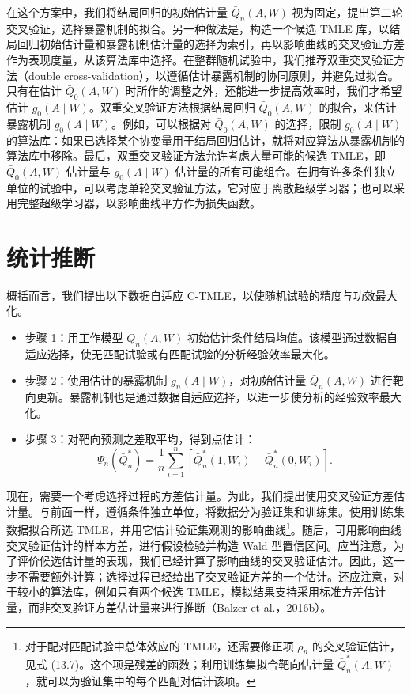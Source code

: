 在这个方案中，我们将结局回归的初始估计量 $\bar Q_n(A,W)$ 视为固定，提出第二轮交叉验证，选择暴露机制的拟合。另一种做法是，构造一个候选 TMLE 库，以结局回归初始估计量和暴露机制估计量的选择为索引，再以影响曲线的交叉验证方差作为表现度量，从该算法库中选择。在整群随机试验中，我们推荐双重交叉验证方法（double cross-validation），以遵循估计暴露机制的协同原则，并避免过拟合。只有在估计 $\bar Q_0(A,W)$ 时所作的调整之外，还能进一步提高效率时，我们才希望估计 $g_0(A\mid W)$。双重交叉验证方法根据结局回归 $\bar Q_0(A,W)$ 的拟合，来估计暴露机制 $g_0(A\mid W)$。例如，可以根据对 $\bar Q_0(A,W)$ 的选择，限制 $g_0(A\mid W)$ 的算法库：如果已选择某个协变量用于结局回归估计，就将对应算法从暴露机制的算法库中移除。最后，双重交叉验证方法允许考虑大量可能的候选 TMLE，即 $\bar Q_0(A,W)$ 估计量与 $g_0(A\mid W)$ 估计量的所有可能组合。在拥有许多条件独立单位的试验中，可以考虑单轮交叉验证方法，它对应于离散超级学习器；也可以采用完整超级学习器，以影响曲线平方作为损失函数。

\section{统计推断}
\label{sec:ch13-inference}

概括而言，我们提出以下数据自适应 C-TMLE，以使随机试验的精度与功效最大化。
\begin{itemize}
 \item 步骤 1：用工作模型 $\bar Q_n(A,W)$ 初始估计条件结局均值。该模型通过数据自适应选择，使无匹配试验或有匹配试验的分析经验效率最大化。
 \item 步骤 2：使用估计的暴露机制 $g_n(A\mid W)$，对初始估计量 $\bar Q_n(A,W)$ 进行靶向更新。暴露机制也是通过数据自适应选择，以进一步使分析的经验效率最大化。
 \item 步骤 3：对靶向预测之差取平均，得到点估计：
 \[
  \Psi_n(\bar Q_n^*)
  =\frac1n\sum_{i=1}^n[\bar Q_n^*(1,W_i)-\bar Q_n^*(0,W_i)].
 \]
\end{itemize}

现在，需要一个考虑选择过程的方差估计量。为此，我们提出使用交叉验证方差估计量。与前面一样，遵循条件独立单位，将数据分为验证集和训练集。使用训练集数据拟合所选 TMLE，并用它估计验证集观测的影响曲线\footnote{对于配对匹配试验中总体效应的 TMLE，还需要修正项 $\rho_n$ 的交叉验证估计，见式 (13.7)。这个项是残差的函数；利用训练集拟合靶向估计量 $\bar Q_n^*(A,W)$，就可以为验证集中的每个匹配对估计该项。}。随后，可用影响曲线交叉验证估计的样本方差，进行假设检验并构造 Wald 型置信区间。应当注意，为了评价候选估计量的表现，我们已经计算了影响曲线的交叉验证估计。因此，这一步不需要额外计算；选择过程已经给出了交叉验证方差的一个估计。还应注意，对于较小的算法库，例如只有两个候选 TMLE，模拟结果支持采用标准方差估计量，而非交叉验证方差估计量来进行推断（Balzer et al.，2016b）。

